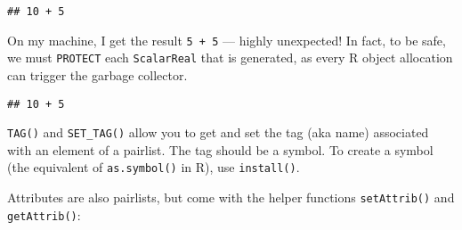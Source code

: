 \begin{verbatim}
## 10 + 5
\end{verbatim}

\begin{Shaded}
\begin{Highlighting}[]
\NormalTok{(}\NormalTok{)}
\end{Highlighting}
\end{Shaded}

On my machine, I get the result \texttt{5\ +\ 5} --- highly unexpected!
In fact, to be safe, we must \texttt{PROTECT} each \texttt{ScalarReal}
that is generated, as every R object allocation can trigger the garbage
collector.

\begin{Shaded}
\begin{Highlighting}[]
\StringTok{ }\NormalTok{(}\NormalTok{, }
\StringTok{    )}
\StringTok{  )));}
\NormalTok{)}
\NormalTok{(}\NormalTok{)}
\NormalTok{()}
\end{Highlighting}
\end{Shaded}

\begin{verbatim}
## 10 + 5
\end{verbatim}

\begin{Shaded}
\begin{Highlighting}[]
\NormalTok{(}\NormalTok{)}
\end{Highlighting}
\end{Shaded}

\texttt{TAG()} and \texttt{SET\_TAG()} allow you to get and set the tag
(aka name) associated with an element of a pairlist. The tag should be a
symbol. To create a symbol (the equivalent of \texttt{as.symbol()} in
R), use \texttt{install()}.

Attributes are also pairlists, but come with the helper functions
\texttt{setAttrib()} and \texttt{getAttrib()}:


